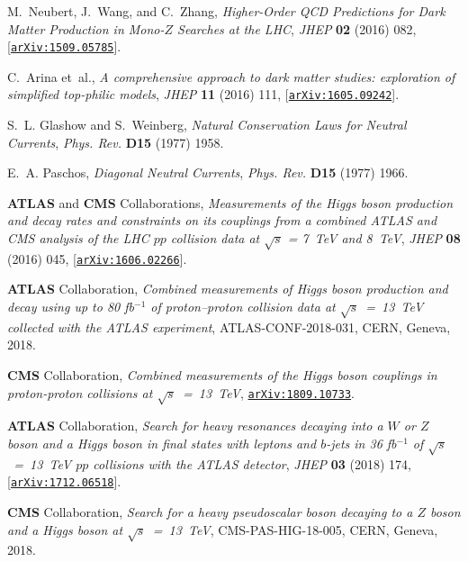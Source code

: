 \documentclass[a4paper, 11pt,notoc]{article}
\begin{document}
\begin{thebibliography}{100}
M.~Neubert, J.~Wang, and C.~Zhang, {\it {Higher-Order QCD Predictions for Dark
  Matter Production in Mono-$Z$ Searches at the LHC}},  {\em JHEP} {\bf 02}
  (2016) 082, [\href{http://arxiv.org/abs/1509.05785}{{\tt arXiv:1509.05785}}].

C.~Arina et~al., {\it {A comprehensive approach to dark matter studies:
  exploration of simplified top-philic models}},  {\em JHEP} {\bf 11} (2016)
  111, [\href{http://arxiv.org/abs/1605.09242}{{\tt arXiv:1605.09242}}].

S.~L. Glashow and S.~Weinberg, {\it {Natural Conservation Laws for Neutral
  Currents}},  {\em Phys. Rev.} {\bf D15} (1977) 1958.

E.~A. Paschos, {\it {Diagonal Neutral Currents}},  {\em Phys. Rev.} {\bf D15}
  (1977) 1966.

{\bf ATLAS} and {\bf CMS} Collaborations, {\it {Measurements of the Higgs
  boson production and decay rates and constraints on its couplings from a
  combined ATLAS and CMS analysis of the LHC $pp$ collision data at $ \sqrt{s}$ = 7~TeV
  and 8~TeV}},  {\em JHEP} {\bf 08} (2016) 045,
  [\href{http://arxiv.org/abs/1606.02266}{{\tt arXiv:1606.02266}}].

{\bf ATLAS} Collaboration, {\it {Combined measurements of Higgs boson
  production and decay using up to 80 fb$^{-1}$ of proton--proton collision
  data at $\sqrt{s}$~=~13~TeV collected with the ATLAS experiment}},  
  ATLAS-CONF-2018-031, CERN, Geneva, 2018.

{\bf CMS} Collaboration, {\it {Combined measurements of the Higgs boson
  couplings in proton-proton collisions at $\sqrt{s}$~=~13~TeV}},  \href{http://arxiv.org/abs/1809.10733}{{\tt arXiv:1809.10733}}.

{\bf ATLAS} Collaboration, {\it {Search for heavy resonances
  decaying into a $W$ or $Z$ boson and a Higgs boson in final states with
  leptons and $b$-jets in 36 fb$^{-1}$ of $\sqrt s$~=~13~TeV $pp$ collisions
  with the ATLAS detector}},  {\em JHEP} {\bf 03} (2018) 174,
  [\href{http://arxiv.org/abs/1712.06518}{{\tt arXiv:1712.06518}}].

{\bf CMS} Collaboration, {\it {Search for a heavy pseudoscalar boson decaying
  to a $Z$ boson and a Higgs boson at $\sqrt{s}$~=~13~TeV}},  
  CMS-PAS-HIG-18-005, CERN, Geneva, 2018.


\end{thebibliography}
\end{document}
